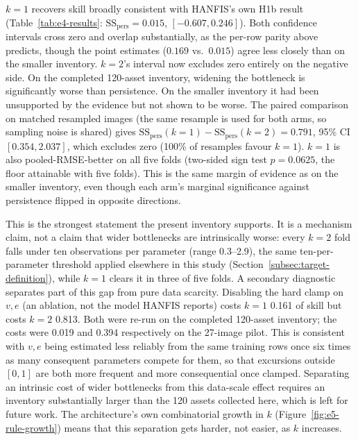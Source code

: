 \documentclass[pdflatex,sn-basic]{sn-jnl}
\theoremstyle{thmstyleone}%
\theoremstyle{thmstyletwo}%
\theoremstyle{thmstylethree}%
\begin{document}
$k{=}1$ recovers skill broadly consistent with HANFIS's own H1b result (Table~\ref{tab:e4-results}: $\mathrm{SS}_{\mathrm{pers}}=0.015$, $[-0.607,0.246]$). Both confidence intervals cross zero and overlap substantially, as the per-row parity above predicts, though the point estimates ($0.169$ vs.\ $0.015$) agree less closely than on the smaller inventory. $k{=}2$'s interval now excludes zero entirely on the negative side. On the completed 120-asset inventory, widening the bottleneck is significantly worse than persistence. On the smaller inventory it had been unsupported by the evidence but not shown to be worse. The paired comparison on matched resampled images (the same resample is used for both arms, so sampling noise is shared) gives $\mathrm{SS}_{\mathrm{pers}}(k{=}1)-\mathrm{SS}_{\mathrm{pers}}(k{=}2)=0.791$, 95\% CI $[0.354,2.037]$, which excludes zero (100\% of resamples favour $k{=}1$). $k{=}1$ is also pooled-RMSE-better on all five folds (two-sided sign test $p=0.0625$, the floor attainable with five folds). This is the same margin of evidence as on the smaller inventory, even though each arm's marginal significance against persistence flipped in opposite directions.

This is the strongest statement the present inventory supports. It is a mechanism claim, not a claim that wider bottlenecks are intrinsically worse: every $k{=}2$ fold falls under ten observations per parameter (range 0.3--2.9), the same ten-per-parameter threshold applied elsewhere in this study (Section~\ref{subsec:target-definition}), while $k{=}1$ clears it in three of five folds. A secondary diagnostic separates part of this gap from pure data scarcity. Disabling the hard clamp on $v,e$ (an ablation, not the model HANFIS reports) costs $k{=}1$ 0.161 of skill but costs $k{=}2$ 0.813. Both were re-run on the completed 120-asset inventory; the costs were 0.019 and 0.394 respectively on the 27-image pilot. This is consistent with $v,e$ being estimated less reliably from the same training rows once six times as many consequent parameters compete for them, so that excursions outside $[0,1]$ are both more frequent and more consequential once clamped. Separating an intrinsic cost of wider bottlenecks from this data-scale effect requires an inventory substantially larger than the 120 assets collected here, which is left for future work. The architecture's own combinatorial growth in $k$ (Figure~\ref{fig:e5-rule-growth}) means that this separation gets harder, not easier, as $k$ increases.
\end{document}
